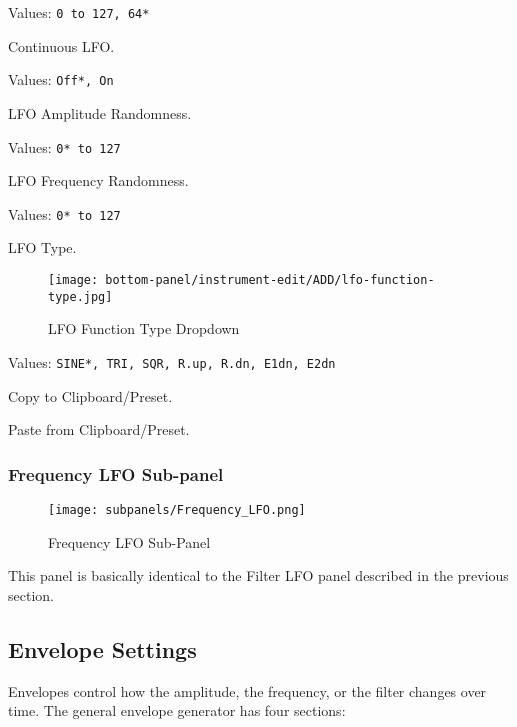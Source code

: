    Values: \texttt{0 to 127, 64*}

   Continuous LFO.

   Values: \texttt{Off*, On}

   LFO Amplitude Randomness.

   Values: \texttt{0* to 127}

   LFO Frequency Randomness.

   Values: \texttt{0* to 127}

   LFO Type.

\begin{figure}[H]
   \centering 
   \texttt{[image: bottom-panel/instrument-edit/ADD/lfo-function-type.jpg]}
   \caption[LFO Function Types]{LFO Function Type Dropdown}
   \label{fig:frequency_lfo_dropdown}
\end{figure}

   Values: \texttt{SINE*, TRI, SQR, R.up, R.dn, E1dn, E2dn}

   Copy to Clipboard/Preset.

   Paste from Clipboard/Preset.

\subsubsection{Frequency LFO Sub-panel}
\label{subsubsec:frequency_lfo_sub_panel}

\begin{figure}[H]
   \centering 
   \texttt{[image: subpanels/Frequency\_LFO.png]}
   \caption[Frequency LFO Sub-Panel]{Frequency LFO Sub-Panel}
   \label{fig:frequency_lfo_subpanel}
\end{figure}

   This panel is basically identical to the Filter LFO panel described
   in the previous section.


\subsection{Envelope Settings}
\label{subsec:envelope_settings}

   Envelopes control how the amplitude, the frequency, or the filter changes
   over time.  The general envelope generator has four sections:

